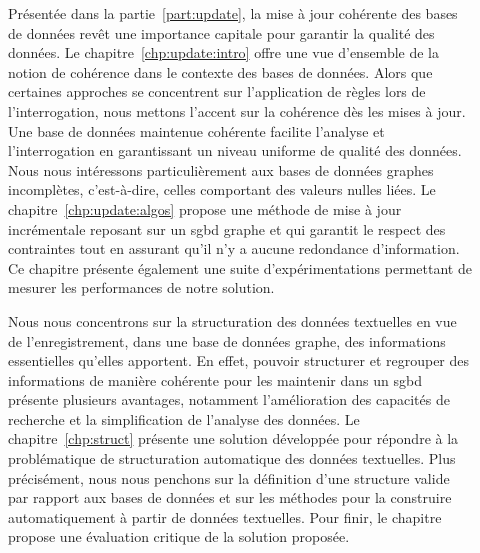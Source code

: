 \begin{description}
    \item[] Présentée dans la partie~\ref{part:update}, la mise à jour cohérente des bases de données revêt une importance capitale pour garantir la qualité des données.
    Le chapitre~\ref{chp:update:intro} offre une vue d'ensemble de la notion de cohérence dans le contexte des bases de données.
    Alors que certaines approches se concentrent sur l'application de règles lors de l'interrogation, nous mettons l'accent sur la cohérence dès les mises à jour.
    Une base de données maintenue cohérente facilite l'analyse et l'interrogation en garantissant un niveau uniforme de qualité des données.
    Nous nous intéressons particulièrement aux bases de données graphes incomplètes, c'est-à-dire, celles comportant des valeurs nulles liées.
    Le chapitre~\ref{chp:update:algos} propose une méthode de mise à jour incrémentale reposant sur un \gls{sgbd} graphe et qui garantit le respect des contraintes tout en assurant qu'il n'y a aucune redondance d'information.
    Ce chapitre présente également une suite d'expérimentations permettant de mesurer les performances de notre solution.

    \item[] Nous nous concentrons sur la structuration des données textuelles en vue de l'enregistrement, dans une base de données graphe, des informations essentielles qu'elles apportent.
    En effet, pouvoir structurer et regrouper des informations de manière cohérente pour les maintenir dans un \gls{sgbd} présente plusieurs avantages, notamment l'amélioration des capacités de recherche et la simplification de l'analyse des données.
    Le chapitre~\ref{chp:struct} présente une solution développée pour répondre à la problématique de structuration automatique des données textuelles.
    Plus précisément, nous nous penchons sur la définition d'une structure valide par rapport aux bases de données et sur les méthodes pour la construire automatiquement à partir de données textuelles.
    Pour finir, le chapitre propose une évaluation critique de la solution proposée.


\end{description}
